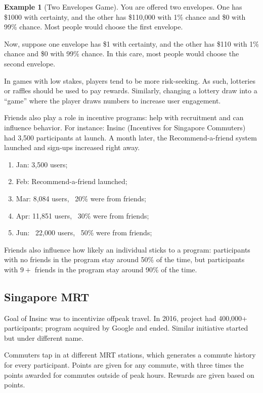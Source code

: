 \documentclass[dvipsnames]{article}
\theoremstyle{definition}
\newtheorem{example}[definition]{Example}
\theoremstyle{remark}
\begin{document}
\begin{example}[Two Envelopes Game]
	You are offered two envelopes. One has \$1000 with certainty, and the other has \$110,000 with 1\% chance and \$0 with 99\% chance. Most people would choose the first envelope. 
	
	Now, suppose one envelope has \$1 with certainty, and the other has \$110 with 1\% chance and \$0 with 99\% chance. In this care, most people would choose the second envelope.
\end{example}

In games with low stakes, players tend to be more risk-seeking. As such, lotteries or raffles should be used to pay rewards. Similarly, changing a lottery draw into a ``game'' where the player draws numbers to increase user engagement. 

Friends also play a role in incentive programs: help with recruitment and can influence behavior. For instance: Insinc (Incentives for Singapore Commuters) had 3,500 participants at launch. A month later, the Recommend-a-friend system launched and sign-ups increased right away.
\begin{enumerate}
	\item Jan: 3,500 users;
	\item Feb: Recommend-a-friend launched;
	\item Mar: 8,084 users, ~20\% were from friends;
	\item Apr: 11,851 users, ~30\% were from friends;
	\item Jun: ~22,000 users, ~50\% were from friends;
\end{enumerate}
Friends also influence how likely an individual sticks to a program: participants with no friends in the program stay around 50\% of the time, but participants with $9+$ friends in the program stay around 90\% of the time.

\subsection{Singapore MRT} 
Goal of Insinc was to incentivize offpeak travel. In 2016, project had 400,000+ participants; program acquired by Google and ended. Similar initiative started but under different name.

Commuters tap in at different MRT stations, which generates a commute history for every participant. Points are given for any commute, with three times the points awarded for commutes outside of peak hours. Rewards are given based on points.
\end{document}
